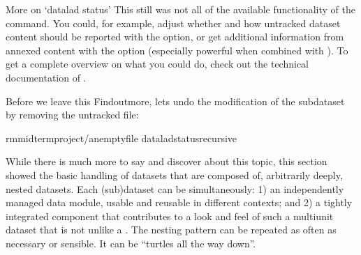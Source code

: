 \begin{findoutmore}[label={fom-status}, before title={\thetcbcounter\ }, float, check odd page=true]{More on ‘datalad status’}
\sphinxAtStartPar
This still was not all of the available functionality of the
 command. You could, for example, adjust whether and
how untracked dataset content should be reported with the 
option, or get additional information from annexed content with the 
option (especially powerful when combined with ). To get a complete overview on what you could do, check out the technical
documentation of  .

\sphinxAtStartPar
Before we leave this Find\sphinxhyphen{}out\sphinxhyphen{}more, lets undo the modification of the subdataset
by removing the untracked file:

\begin{sphinxVerbatim}[commandchars=\\\{\}]
rmmidterm\PYGZus{}project/an\PYGZus{}empty\PYGZus{}file
dataladstatus\PYGZhy{}\PYGZhy{}recursive
\end{sphinxVerbatim}


\end{findoutmore}

\sphinxAtStartPar
While there is much more to say and discover about this topic, this section showed the basic handling of datasets that are composed of, arbitrarily deeply, nested datasets.
Each (sub)dataset can be simultaneously: 1) an independently managed data module, usable and reusable in different contexts; and 2) a tightly integrated component that contributes to a look and feel of such a multi\sphinxhyphen{}unit dataset that is not unlike a .
The nesting pattern can be repeated as often as necessary or sensible.
It can be “turtles all the way down”.

\sphinxstepscope

\ignorespaces 

